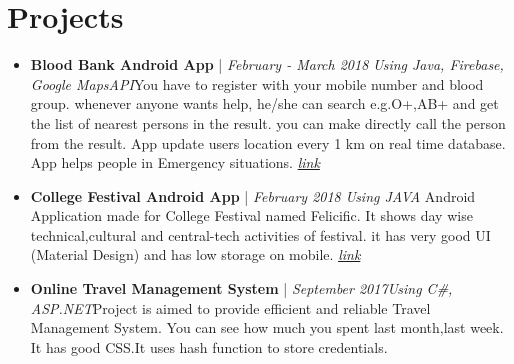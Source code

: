 \documentclass[11pt,a4paper,sans]{moderncv}        %
\begin{document}
\section{Projects}
\vspace{6pt}


\begin{itemize}

\item \textbf{Blood Bank Android App} | \textit{February - March 2018} \vspace{3pt}\newline\textit{Using Java, Firebase, Google MapsAPI}\vspace{4pt}\newline \small{You have to register with your mobile number and blood group. whenever anyone wants help, he/she can search e.g.O+,AB+ and get the list of nearest persons in the result. you can make directly call the person from the result. App update users location every 1 km on real time database. App helps people in Emergency situations.} \href{https://github.com/denishrana09/BloodBankApp}{\textit{link}}\vspace{6pt}



\item{\textbf{College Festival Android App} | \textit{February 2018} \vspace{3pt}\newline\textit{Using JAVA}
\vspace{4pt}\newline
\small{Android Application made for College Festival named Felicific. It shows day wise technical,cultural and central-tech activities of festival. it has very good UI (Material Design) and has low storage on mobile.}}
\href{https://play.google.com/store/apps/details?id=in.opensol.felicific}{\textit{link}}\vspace{6pt}


\item \textbf{Online Travel Management System} | \textit{September 2017}\vspace{3pt}\newline\textit{Using C\#, ASP.NET}\vspace{4pt}\newline \small{Project is aimed to provide efficient and reliable Travel Management System. You can see how much you spent last month,last week. It has good CSS.It uses hash function to store credentials.} 
\end{itemize}
\end{document}
